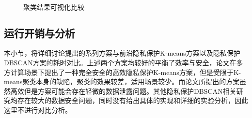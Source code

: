 \begin{figure}[htb]
	\\
	\caption{聚类结果可视化比较}
	\label{s4-img-clures}
\end{figure}

\subsection{运行开销与分析}
本小节，将详细讨论提出的系列方案与前沿隐私保护K-means方案\cite{mohassel2019practical}以及隐私保护DBSCAN方案\cite{bozdemir2021privacy}的耗时对比。上述两个方案均较好的平衡了效率与安全，论文\cite{mohassel2019practical}在多方计算场景下提出了一种完全安全的高效隐私保护K-means方案，但是受限于K-means聚类本身的缺陷，聚类的效果较差，适用场景较少。而论文\cite{bozdemir2021privacy}所提出的方案虽然高效但是方案可能会存在轻微的数据泄露问题。其他隐私保护DBSCAN相关研究均存在较大的数据安全问题，同时没有给出具体的实现和详细的实验分析，因此这里不进行对比分析。

